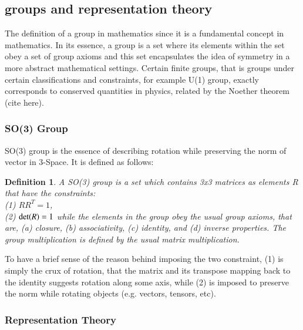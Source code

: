 \documentclass{article}
\newtheorem{definition}{Definition}
\begin{document}
\subsection{groups and representation theory}%
  \label{sub: groups and representation theory}
  The definition of a group in mathematics 
  since it is a fundamental concept in mathematics. In its essence, a group 
  is a set where its elements within the set obey a set of group 
  axioms and this set encapsulates the idea of symmetry in a 
  more abstract mathematical settings. Certain finite groups, 
  that is groups under certain classifications and constraints, 
  for example U(1) group, exactly corresponds to 
  conserved quantities in physics, related by the Noether 
  theorem (cite here). 

  \subsubsection{SO(3) Group}%
    \label{sub:SO(3) Group}

    SO(3) group is the essence of describing rotation while
    preserving the norm of vector in 3-Space. It is defined as follows:
    \begin{definition}
      A SO(3) group is a set which contains 3x3 matrices as
      elements R that have the constraints: \\ 
      (1) \hspace{0.3cm} $RR^T = 1$, \\ 
      (2) \hspace{0.3cm} $ \textnormal{det}(R) = 1 $
      while the elements in the group obey the usual group axioms,
      that are, (a) closure, (b) associativity, (c) identity, and
      (d) inverse properties. The group multiplication is defined by the
      usual matrix multiplication.
    \end{definition}
   
    To have a brief sense of the reason behind imposing the two
    constraint, (1) is simply the crux of rotation, that the matrix
    and its transpose mapping back to the identity suggests rotation
    along some axis, while (2) is imposed to preserve the norm while
    rotating objects (e.g. vectors, tensors, etc).

  \subsubsection{Representation Theory}%
    \label{sub: Representation Theory}
    
\end{document}
